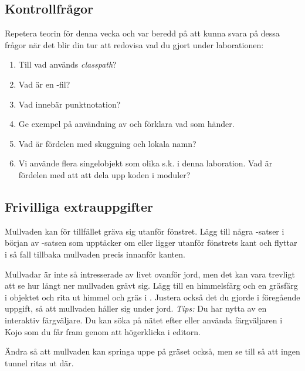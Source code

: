 \clearpage

\subsection{Kontrollfrågor}\Checkpoint

\noindent Repetera teorin för denna vecka och var beredd på att kunna svara på dessa frågor när det blir din tur att redovisa vad du gjort under laborationen:

\begin{enumerate}[noitemsep]
\item Till vad används \emph{classpath}?
\item Vad är en -fil?
\item Vad innebär punktnotation?
\item Ge exempel på användning av  och förklara vad som händer.
\item Vad är fördelen med skuggning och lokala namn?
\item Vi använde flera singelobjekt som olika s.k.  i denna laboration. Vad är fördelen med att att dela upp koden i moduler?
\end{enumerate}





\subsection{Frivilliga extrauppgifter}

\Task
Mullvaden kan för tillfället gräva sig utanför fönstret.
Lägg till några -satser i början av -satsen som upptäcker om  eller  ligger utanför fönstrets kant och flyttar i så fall tillbaka mullvaden precis innanför kanten.

\Task
Mullvadar är inte så intresserade av livet ovanför jord, men det kan vara trevligt att se hur långt ner mullvaden grävt sig.
Lägg till en himmelsfärg och en gräsfärg i objektet  och rita ut himmel och gräs i .
Justera också det du gjorde i föregående uppgift, så att mullvaden håller sig under jord. \emph{Tips:} Du har nytta av en interaktiv färgväljare. Du kan söka på nätet efter  eller använda färgväljaren i Kojo som du får fram genom att högerklicka i editorn.

\Task
Ändra så att mullvaden kan springa uppe på gräset också, men se till så att ingen tunnel ritas ut där.

